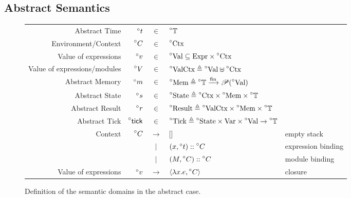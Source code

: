 \documentclass{article}
\theoremstyle{definition}
\newcommand*{\vbar}{|}
\newcommand*{\cons}{::}
\newcommand*{\pset}{\mathscr{P}}
\newcommand*{\A}[1]{\prescript{\circ}{}{#1}}
\newcommand*{\Expr}{\text{Expr}}
\newcommand*{\ExprVar}{\text{Var}}
\newcommand*{\Time}{\mathbb{T}}
\newcommand*{\Ctx}{\text{Ctx}}
\newcommand*{\Value}{\text{Val}}
\newcommand*{\Mem}{\text{Mem}}
\newcommand*{\mem}{m}
\newcommand*{\State}{\text{State}}
\newcommand*{\Result}{\text{Result}}
\newcommand*{\Tick}{\text{Tick}}
\newcommand*{\fin}[2]{{#1}\xrightarrow{\text{fin}}{#2}}
\newcommand*{\tick}{\mathsf{tick}}
\begin{document}
\subsection{Abstract Semantics}
\begin{figure}[h!]
  \centering
  \begin{tabular}{rrcll}
    Abstract Time                & $\A{t}$     & $\in$         & $\A{\Time}$                                                                                            \\
    Environment/Context          & $\A{C}$     & $\in$         & $\A{\Ctx}$                                                                                             \\
    Value of expressions         & $\A{v}$     & $\in$         & $\A{\Value} \subseteq \Expr\times\A{\Ctx}$                                                             \\
    Value of expressions/modules & $\A{V}$     & $\in$         & $\A{\Value\Ctx}\triangleq\A{\Value}\uplus\A{\Ctx}$                                                     \\
    Abstract Memory              & $\A{\mem}$  & $\in$         & $\A{\Mem} \triangleq \fin{\A{\Time}}{\pset(\A{\Value})}$                                               \\
    Abstract State               & $\A{s}$     & $\in$         & $\A{\State} \triangleq \A{\Ctx}\times\A{\Mem}\times\A{\Time}$                                          \\
    Abstract Result              & $\A{r}$     & $\in$         & $\A{\Result} \triangleq \A{\Value\Ctx}\times\A{\Mem}\times\A{\Time}$                                   \\
    Abstract Tick                & $\A{\tick}$ & $\in$         & $\A{\Tick}\triangleq\A{\State}\times\ExprVar\times\A{\Value}\rightarrow\A{\Time}$                      \\
    Context                      & $\A{C}$     & $\rightarrow$ & []                                                                                & empty stack        \\
                                 &             & $\vbar$       & $(x,\A{t})\cons \A{C}$                                                            & expression binding \\
                                 &             & $\vbar$       & $(M,\A{C})\cons \A{C}$                                                            & module binding     \\
    Value of expressions         & $\A{v}$     & $\rightarrow$ & $\langle \lambda x.e, \A{C} \rangle$                                              & closure
  \end{tabular}
  \caption{Definition of the semantic domains in the abstract case.}
  \label{fig:absdom}
\end{figure}
\end{document}
